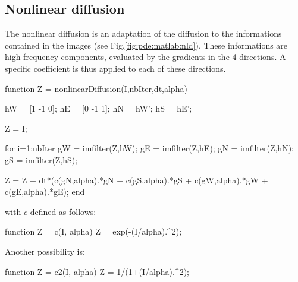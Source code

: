 \subsection{Nonlinear diffusion}
The nonlinear diffusion is an adaptation of the diffusion to the informations contained in the images (see Fig.\ref{fig:pde:matlab:nld}). These informations are high frequency components, evaluated by the gradients in the 4 directions. A specific coefficient is thus applied to each of these directions.

\begin{matlab}
function Z = nonlinearDiffusion(I,nbIter,dt,alpha)

hW = [1 -1 0];
hE = [0 -1 1];
hN = hW';
hS = hE';

Z = I;

for i=1:nbIter
    gW = imfilter(Z,hW);
    gE = imfilter(Z,hE);
    gN = imfilter(Z,hN);
    gS = imfilter(Z,hS);
    
    Z = Z + dt*(c(gN,alpha).*gN + c(gS,alpha).*gS + c(gW,alpha).*gW + c(gE,alpha).*gE);
end
\end{matlab}
with $c$ defined as follows:
\begin{matlab}
function Z = c(I, alpha)
%
Z = exp(-(I/alpha).^2);
\end{matlab}
Another possibility is:
\begin{matlab}
function Z = c2(I, alpha)
%
Z = 1/(1+(I/alpha).^2);
\end{matlab}

